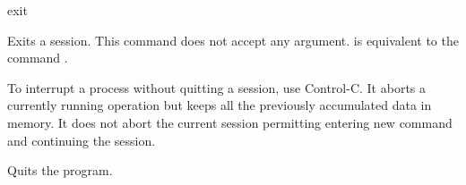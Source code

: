\begin{command}{exit}{} 

	\syntax{\obligatory{()}}

	\begin{poydescription}
         Exits a \poy session. This command does not accept any argument.
          is equivalent to the command .

         \begin{statement}
         To interrupt a process without quitting a \poy session, use Control-C.
         It aborts a currently running operation but keeps all the previously accumulated
         data in memory. It does not abort the current session permitting entering new
         command and continuing the session.
        \end{statement}
	
	 \end{poydescription}
	 
    \begin{poyexamples}
            {Quits the program.}
    \end{poyexamples}

    \begin{poyalso}
    \end{poyalso}

\end{command}

